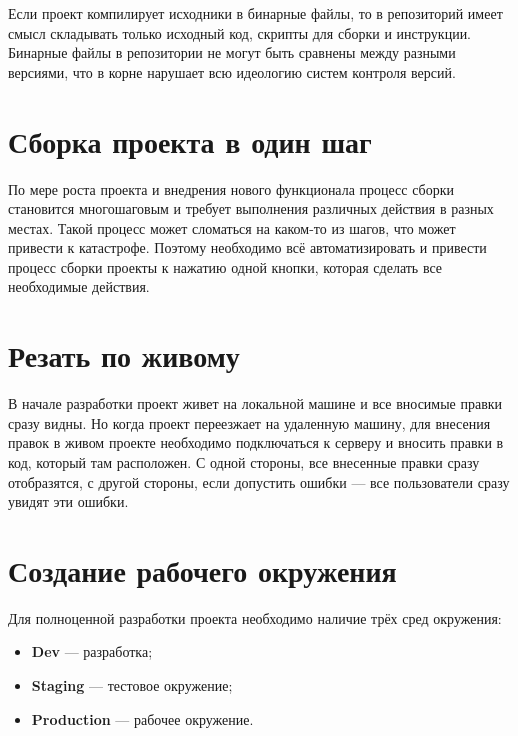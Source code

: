 Если проект компилирует исходники в бинарные файлы, то в репозиторий имеет смысл складывать только исходный код, скрипты для сборки и инструкции. Бинарные файлы в репозитории не могут быть сравнены между разными версиями, что в корне нарушает всю идеологию систем контроля версий.


\section{ Сборка проекта в один шаг } \label{sect3_7}

По мере роста проекта и внедрения нового функционала процесс сборки становится многошаговым и требует выполнения различных действия в разных местах. Такой процесс может сломаться на каком-то из шагов, что может привести к катастрофе. Поэтому необходимо всё автоматизировать и привести процесс сборки проекты к нажатию одной кнопки, которая сделать все необходимые действия.

\section{ Резать по живому } \label{sect3_8}

В начале разработки проект живет на локальной машине и все вносимые правки сразу видны. Но когда проект переезжает на удаленную машину, для внесения правок в живом проекте необходимо подключаться к серверу и вносить правки в код, который там расположен. С одной стороны, все внесенные правки сразу отобразятся, с другой стороны, если допустить ошибки --- все пользователи сразу увидят эти ошибки.

\section{ Создание рабочего окружения } \label{sect3_9}

Для полноценной разработки проекта необходимо наличие трёх сред окружения:
\begin{itemize}

\item \textbf{Dev} --- разработка;

\item \textbf{Staging} --- тестовое окружение;

\item \textbf{Production} --- рабочее окружение.

\end{itemize}

